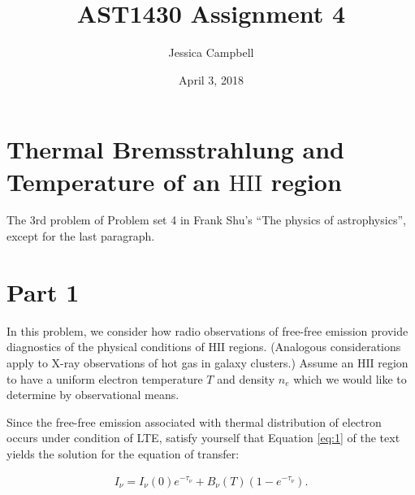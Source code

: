 \documentclass[12pt]{article}
\begin{document}
    
 
 
\title{AST1430 Assignment 4}
\author{Jessica Campbell}
\date{April 3, 2018}
\maketitle


\section{Thermal Bremsstrahlung and Temperature of an $\mathrm{HII}$ region}

The 3rd problem of Problem set 4 in Frank Shu’s ``The physics of astrophysics'', except for the last paragraph.


\section*{Part 1}

In this problem, we consider how radio observations of free-free emission provide diagnostics of the physical conditions of $\mathrm{HII}$ regions. (Analogous considerations apply to X-ray observations of hot gas in galaxy clusters.) Assume an $\mathrm{HII}$ region to have a uniform electron temperature $T$ and density $n_e$ which we would like to determine by observational means.

Since the free-free emission associated with thermal distribution of electron occurs under condition of LTE, satisfy yourself that Equation \ref{eq:1} of the text yields the solution for the equation of transfer:

\begin{align} \label{eq:1}
I_\nu = I_\nu(0)e^{-\tau_\nu}+B_\nu(T)(1-e^{-\tau_\nu}).
\end{align}
\end{document}
